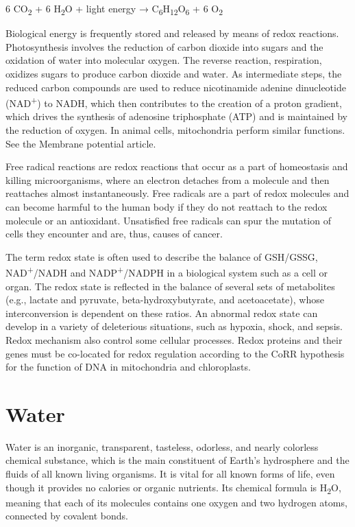 \documentclass[
]{book}
\begin{document}
6 CO\textsubscript{2} + 6 H\textsubscript{2}O + light energy → C\textsubscript{6}H\textsubscript{12}O\textsubscript{6} + 6 O\textsubscript{2}

Biological energy is frequently stored and released by means of redox reactions. Photosynthesis involves the reduction of carbon dioxide into sugars and the oxidation of water into molecular oxygen. The reverse reaction, respiration, oxidizes sugars to produce carbon dioxide and water. As intermediate steps, the reduced carbon compounds are used to reduce nicotinamide adenine dinucleotide (NAD\textsuperscript{+}) to NADH, which then contributes to the creation of a proton gradient, which drives the synthesis of adenosine triphosphate (ATP) and is maintained by the reduction of oxygen. In animal cells, mitochondria perform similar functions. See the Membrane potential article.

Free radical reactions are redox reactions that occur as a part of homeostasis and killing microorganisms, where an electron detaches from a molecule and then reattaches almost instantaneously. Free radicals are a part of redox molecules and can become harmful to the human body if they do not reattach to the redox molecule or an antioxidant. Unsatisfied free radicals can spur the mutation of cells they encounter and are, thus, causes of cancer.

The term redox state is often used to describe the balance of GSH/GSSG, NAD\textsuperscript{+}/NADH and NADP\textsuperscript{+}/NADPH in a biological system such as a cell or organ. The redox state is reflected in the balance of several sets of metabolites (e.g., lactate and pyruvate, beta-hydroxybutyrate, and acetoacetate), whose interconversion is dependent on these ratios. An abnormal redox state can develop in a variety of deleterious situations, such as hypoxia, shock, and sepsis. Redox mechanism also control some cellular processes. Redox proteins and their genes must be co-located for redox regulation according to the CoRR hypothesis for the function of DNA in mitochondria and chloroplasts.

\hypertarget{water}{%
\section{Water}\label{water}}

Water is an inorganic, transparent, tasteless, odorless, and nearly colorless chemical substance, which is the main constituent of Earth's hydrosphere and the fluids of all known living organisms. It is vital for all known forms of life, even though it provides no calories or organic nutrients. Its chemical formula is H\textsubscript{2}O, meaning that each of its molecules contains one oxygen and two hydrogen atoms, connected by covalent bonds.
\end{document}
